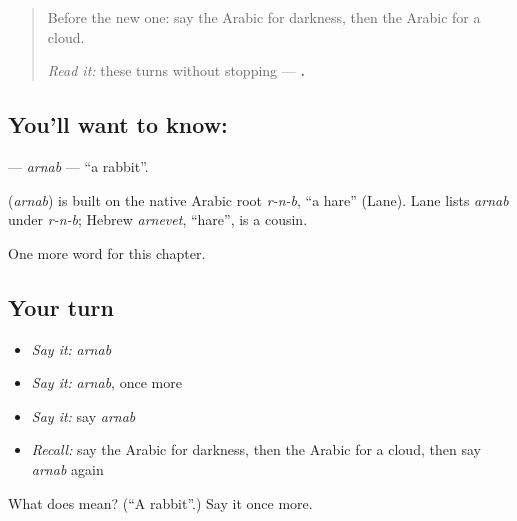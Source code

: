 \begin{quote}
Before the new one: say the Arabic for darkness, then the Arabic for a cloud.

\emph{Read it:} these turns without stopping — \textbf{   .}
\end{quote}

\subsection*{You'll want to know: }
\textbf{} — \emph{arnab} — \textquotedblleft{}a rabbit\textquotedblright{}.

\begin{cousinweb}
\textbf{} (\emph{arnab}) is built on the native Arabic root \emph{r-n-b}, \textquotedblleft{}a hare\textquotedblright{} (Lane). Lane lists \emph{arnab} under \emph{r-n-b}; Hebrew \emph{arnevet}, \textquotedblleft{}hare\textquotedblright{}, is a cousin.
\end{cousinweb}

\begin{grammarlens}[title={What you've built}]
One more word for this chapter.
\end{grammarlens}

\subsection*{Your turn}
\begin{itemize}
\raggedright
  \item \emph{Say it:} \emph{arnab}
  \item \emph{Say it:} \emph{arnab}, once more
  \item \emph{Say it:} say \emph{arnab}
  \item \emph{Recall:} say the Arabic for darkness, then the Arabic for a cloud, then say \emph{arnab} again
\end{itemize}

\begin{tcolorbox}[breakable,colback=teal!4,colframe=teal!35!black,title={Before you move on}]
What does  mean? (\textquotedblleft{}A rabbit\textquotedblright{}.) Say it once more.
\end{tcolorbox}
